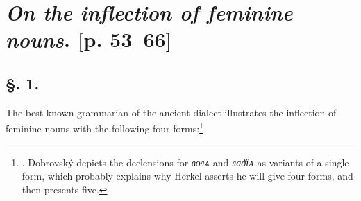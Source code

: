 \section*{\textit{On the inflection of feminine nouns}. [p. 53--66]}

\subsection*{\hspace*{\fill}§. 1.\hspace*{\fill}}

The best-known grammarian of the ancient dialect illustrates the inflection of feminine nouns with the following four forms:\footnote{\citet[478]{dobrovsky_institutiones_1822}. Dobrovský depicts the declensions for \textit{волѧ} and \textit{ладїѧ} as variants of a single form, which probably explains why Herkel asserts he will give four forms, and then presents five.}


